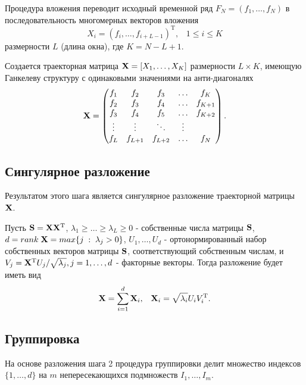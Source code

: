 \documentclass[specialist, substylefile = spbu.rtx,
			   subf, href, 12pt]{disser}
\begin{document}
Процедура вложения переводит исходный временной ряд $F_N = (f_1, \dotsc, f_{N})$ в последовательность многомерных векторов вложения
$$X_i = (f_{i}, \dotsc, f_{i+L-1})^\mathrm{T}, \;\;\; 1 \leq i \leq K$$
размерности $L$ (длина окна), где $K = N - L + 1$. 

Создается траекторная матрица $\bold{X} = [X_1, \dotsc, X_K]$ размерности $L \times K$, имеющую Ганкелеву структуру с одинаковыми значениями на анти-диагоналях
\begin{equation}\label{eq:traj_m}
	\bold{X} =
	\begin{pmatrix}
		f_{1} & f_{2} & f_{3} & \ldots & f_{K}\\
		f_{2} & f_{3} & f_{4} & \ldots & f_{K+1}\\
		f_{3} & f_{4} & f_{5} & \ldots & f_{K+2}\\
		\vdots & \vdots & \ddots & \vdots\\
		f_{L} & f_{L+1} & f_{L+2} & \ldots & f_{N}
	\end{pmatrix}.
\end{equation}

\subsection{Сингулярное разложение}

Результатом этого шага является сингулярное разложение траекторной матрицы $\bold{X}$. 

Пусть $\bold{S} = \bold{X}\bold{X}^\mathrm{T}$, $\lambda_1 \geq \dotsc \geq \lambda_L \geq 0$ - собственные числа матрицы $\bold{S}$, $d = rank\;\bold{X} = max\{j\;:\;\lambda_j > 0\}$, $U_1, \dotsc, U_d$ - ортонормированный набор собственных векторов матрицы $\bold{S}$, соответствующий собственным числам, и $V_j = \bold{X}^\mathrm{T}U_j/\sqrt{\lambda_j}, j = 1, \dotsc, d$ - факторные векторы. Тогда разложение будет иметь вид
\begin{equation}\label{eq:singular_decomp}
	\bold{X} = \sum\limits_{i=1}^{d}\bold{X}_i, \;\;\; \bold{X}_i = \sqrt{\lambda_i}U_iV_i^\mathrm{T}. 
\end{equation}

\subsection{Группировка}

На основе разложения шага 2 процедура группировки делит множество индексов $\{1, \dotsc, d\}$ на $m$ непересекающихся подмножеств $I_1, \dotsc, I_m$.
\end{document}
